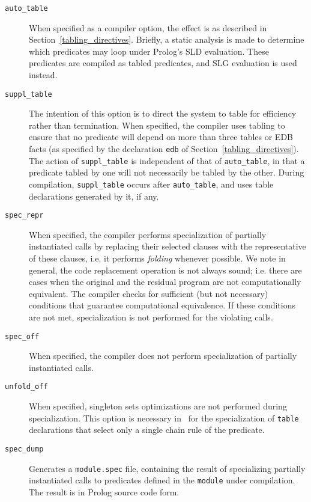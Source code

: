 \begin{description}
\item[{\tt auto\_table}] When specified as a
  compiler option, the effect is as described in
  Section~\ref{tabling_directives}.  Briefly, a static analysis is made to
  determine which predicates may loop under Prolog's SLD evaluation.  These
  predicates are compiled as tabled predicates, and SLG evaluation is used
  instead.
\item[{\tt suppl\_table}] The intention of this
  option is to direct the system to table for efficiency rather than
  termination.  When specified, the compiler uses tabling to ensure that no
  predicate will depend on more than three tables or EDB facts (as
  specified by the declaration {\tt edb} of
  Section~\ref{tabling_directives}).  The action of {\tt suppl\_table} is
  independent of that of {\tt auto\_table}, in that a predicate tabled by
  one will not necessarily be tabled by the other.  During compilation,
  {\tt suppl\_table} occurs after {\tt auto\_table}, and uses table
  declarations generated by it, if any.
\item[{\tt spec\_repr}]
	When specified, the compiler performs specialization of partially
	instantiated calls by replacing their selected clauses with the
	representative of these clauses, i.e. it performs {\em folding\/}
	whenever possible.  We note in general, the code replacement
	operation is not always sound; i.e. there
	are cases when the original and the residual program are not
	computationally equivalent.  The compiler checks for sufficient (but
	not necessary) conditions that guarantee computational equivalence.
	If these conditions are not met, specialization is not performed
	for the violating calls.
\item[{\tt spec\_off}]
	When specified, the compiler does not perform specialization of
	partially instantiated calls.
\item[{\tt unfold\_off}]
	When specified, singleton sets optimizations are not performed
	during specialization.  This option is necessary in \version\
	for the specialization of {\tt table} declarations that select
	only a single chain rule of the predicate.
\item[{\tt spec\_dump}]
	Generates a {\tt module.spec} file, containing the result of
	specializing partially instantiated calls to predicates defined
	in the {\tt module} under compilation.  The result is in Prolog
	source code form.


\end{description}
